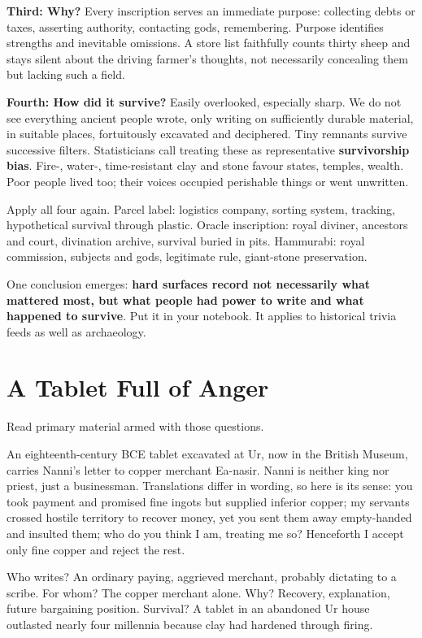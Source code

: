 \textbf{Third: Why?} Every inscription serves an immediate purpose: collecting debts or taxes, asserting authority, contacting gods, remembering. Purpose identifies strengths and inevitable omissions. A store list faithfully counts thirty sheep and stays silent about the driving farmer's thoughts, not necessarily concealing them but lacking such a field.

\textbf{Fourth: How did it survive?} Easily overlooked, especially sharp. We do not see everything ancient people wrote, only writing on sufficiently durable material, in suitable places, fortuitously excavated and deciphered. Tiny remnants survive successive filters. Statisticians call treating these as representative \textbf{survivorship bias}. Fire-, water-, time-resistant clay and stone favour states, temples, wealth. Poor people lived too; their voices occupied perishable things or went unwritten.

Apply all four again. Parcel label: logistics company, sorting system, tracking, hypothetical survival through plastic. Oracle inscription: royal diviner, ancestors and court, divination archive, survival buried in pits. Hammurabi: royal commission, subjects and gods, legitimate rule, giant-stone preservation.

One conclusion emerges: \textbf{hard surfaces record not necessarily what mattered most, but what people had power to write and what happened to survive}. Put it in your notebook. It applies to historical trivia feeds as well as archaeology.

\section{A Tablet Full of Anger}
Read primary material armed with those questions.

An eighteenth-century BCE tablet excavated at Ur, now in the British Museum, carries Nanni's letter to copper merchant Ea-nasir. Nanni is neither king nor priest, just a businessman. Translations differ in wording, so here is its sense: you took payment and promised fine ingots but supplied inferior copper; my servants crossed hostile territory to recover money, yet you sent them away empty-handed and insulted them; who do you think I am, treating me so? Henceforth I accept only fine copper and reject the rest.

Who writes? An ordinary paying, aggrieved merchant, probably dictating to a scribe. For whom? The copper merchant alone. Why? Recovery, explanation, future bargaining position. Survival? A tablet in an abandoned Ur house outlasted nearly four millennia because clay had hardened through firing.

